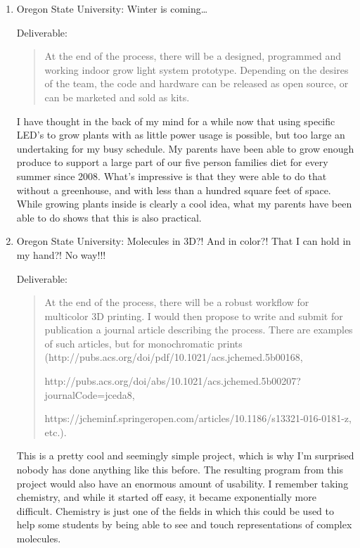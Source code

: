 \begin{singlespace}
\begin{enumerate}
	\vspace{0.1in}
	\item Oregon State University: Winter is coming…
	
	Deliverable:
	\begin{quote}
    	At the end of the process, there will be a designed, programmed and working indoor grow light system prototype. Depending on the desires of the team, the code and hardware can be released as open source, or can be marketed and sold as kits.
    	\cite{WinterIsComing}
	\end{quote}
	
	I have thought in the back of my mind for a while now that using specific LED's to grow plants with as little power usage is possible, but too large an undertaking for my busy schedule.
	My parents have been able to grow enough produce to support a large part of our five person families diet for every summer since 2008.
	What's impressive is that they were able to do that without a greenhouse, and with less than a hundred square feet of space.
	While growing plants inside is clearly a cool idea, what my parents have been able to do shows that this is also practical.
	
	\vspace{0.1in}
	\item Oregon State University: Molecules in 3D?! And in color?! That I can hold in my hand?! No way!!!
	
	Deliverable:
	\begin{quote}
    	At the end of the process, there will be a robust workflow for multicolor 3D printing.
    	I would then propose to write and submit for publication a journal article describing the process.
    	There are examples of such articles, but for monochromatic prints 
    	(http://pubs.acs.org/doi/pdf/10.1021/acs.jchemed.5b00168, 
    	
    	http://pubs.acs.org/doi/abs/10.1021/acs.jchemed.5b00207?journalCode=jceda8, 
    	
    	https://jcheminf.springeropen.com/articles/10.1186/s13321-016-0181-z, etc.).
	    \cite{3DMolecules}
	\end{quote}
	
	This is a pretty cool and seemingly simple project, which is why I'm surprised nobody has done anything like this before.
	The resulting program from this project would also have an enormous amount of usability.
	I remember taking chemistry, and while it started off easy, it became exponentially more difficult.
	Chemistry is just one of the fields in which this could be used to help some students by being able to see and touch representations of complex molecules.
	

\end{enumerate}
\end{singlespace}
